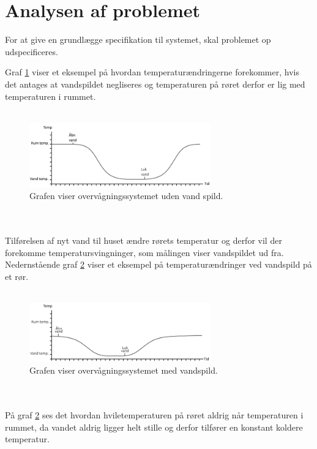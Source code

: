 \section{Analysen af problemet}

For at give en grundlægge specifikation til systemet, skal problemet op udspecificeres.  

Graf \ref{vandspild_graf_normal} viser et eksempel på hvordan temperaturændringerne forekommer, hvis det antages at vandspildet negliseres og temperaturen på røret derfor er lig med temperaturen i rummet. 
\\
\\
\begin{figure}[h!]
  \centering
  \includegraphics[width=0.7\textwidth]{figures/vandspild_graf_normal.png}
  \caption{Grafen viser overvågningssystemet uden vand spild.}
  \label{vandspild_graf_normal}
\end{figure}
\\
\\
Tilførelsen af nyt vand til huset ændre rørets temperatur og derfor vil der forekomme temperatursvingninger, som målingen viser vandspildet ud fra. Nedernstående graf \ref{vandspild_graf_spild} viser et eksempel på temperaturændringer ved vandspild på et rør.
\\
\\
\begin{figure}[h!]
  \centering
  \includegraphics[width=0.7\textwidth]{figures/vandspild_graf_spild.png}
  \caption{Grafen viser overvågningssystemet med vandspild.}
  \label{vandspild_graf_spild}
\end{figure}
\\
\\
På graf \ref{vandspild_graf_spild} ses det hvordan hviletemperaturen på røret aldrig når temperaturen i rummet, da vandet aldrig ligger helt stille og derfor tilfører en konstant koldere temperatur.

